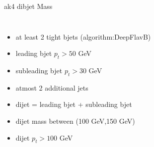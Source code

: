 \documentclass[10pt,xcolor=dvipsnames,aspectratio=169]{beamer}
\begin{document}
\begin{frame}[fragile]{ak4 dibjet Mass}
\begin{columns}
\begin{itemize}
          \item {at least 2 tight bjets (algorithm:DeepFlavB)}
          \item {leading bjet $p_t > 50 $ GeV}
          \item {subleading bjet $p_t > 30 $ GeV}
          \item {atmost 2 additional jets}
          \item {dijet = leading bjet + subleading bjet}
          \item {dijet mass between (100 GeV,150 GeV)}
          \item {dijet $p_t > 100 $ GeV}
        \end{itemize}
      \end{columns}
    \end{frame}

\end{document}
